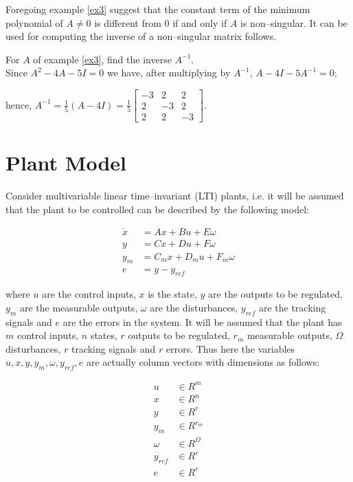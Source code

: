 \documentclass[a4paper]{article}
\theoremstyle{plain} %
{\theorembodyfont{\normalfont}
\newtheorem{Exa}{Example}}
\begin{document}
Foregoing example \ref{ex3} suggest that the constant term of the
minimum polynomial of $A \neq 0$ is different from $0$ if and only
if $A$ is non--singular. It can be used for computing the inverse
of a non--singular matrix follows.

\begin{Exa}
For $A$ of example \ref{ex3}, find the inverse $A^{-1}$. \\ %
Since $A^2-4A-5I = 0$ we have, after multiplying by $A^{-1}$,
$A-4I-5A^{-1} = 0$; %

\vspace{0.5\baselineskip}

hence, $A^{-1}=\frac{1}{5} (A-4I) = \frac{1}{5} \left[
\begin{array}{rrr} -3 & 2 & 2 \\ 2 & -3 & 2 \\ 2 &
2 & -3
\end{array} \right]$.

\end{Exa}

\section{Plant Model}
Consider multivariable linear time--invariant (LTI) plants, i.e.
it will be assumed that the plant to be controlled can be
described by the following model: %

\begin{align}\label{pmodel}
  \dot{x} &= Ax + Bu + E\omega \nonumber \\%
  y &= Cx + Du + F\omega \\ %
  y_m &= C_mx + D_mu + F_m\omega \nonumber \\%
  e &= y - y_{ref} \nonumber
\end{align}

where $u$ are the control inputs, $x$ is the state, $y$ are the
outputs to be regulated, $y_m$ are the measurable outputs,
$\omega$ are the disturbances, $y_{ref}$ are the tracking signals
and $e$ are the errors in the system. It will be assumed that the
plant has $m$ control inputs, $n$ states, $r$ outputs to be
regulated, $r_m$ measurable outputs, $\Omega$ disturbances, $r$
tracking signals and $r$ errors. Thus here the variables
$u,x,y,y_m,\omega,y_{ref},e$ are actually column vectors with
dimensions as follows:

\begin{align}
u &\in R^m \nonumber \\ %
x &\in R^n \nonumber \\%
y &\in R^r \nonumber \\ %
y_m &\in R^{r_m} \nonumber \\ %
\omega &\in R^{\Omega} \nonumber \\ %
y_{ref} &\in R^r \nonumber \\%
e &\in R^r \nonumber
\end{align}
\end{document}
